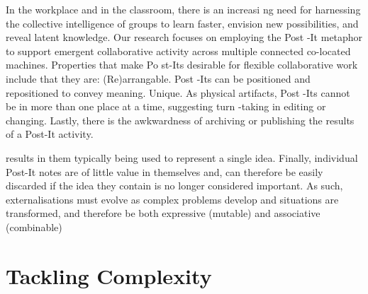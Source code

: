 \cite{digiano_learning_nodate}
In the workplace and in the classroom, there is an increasi ng need for harnessing the collective intelligence of groups to learn faster, envision new possibilities, and reveal latent knowledge.
Our research focuses on employing the Post -It metaphor to support emergent collaborative activity across multiple connected co-located machines.
Properties that make Po st-Its desirable for flexible collaborative work include that they are:
(Re)arrangable. Post -Its can be positioned and repositioned to convey meaning.
Unique. As physical artifacts, Post -Its cannot be in more than one place at a time, suggesting turn -taking in editing or changing.
Lastly, there is the awkwardness of archiving or publishing the results of a Post-It activity.

\cite{dove_grouping_2018}
results in them typically being used to represent a single idea.
Finally, individual Post-It notes are of little value in themselves and, can therefore be easily discarded if the idea they contain is no longer considered important.
As such, externalisations must evolve as complex problems develop and situations are transformed, and therefore be both expressive (mutable) and associative (combinable)


\section{Tackling Complexity}

